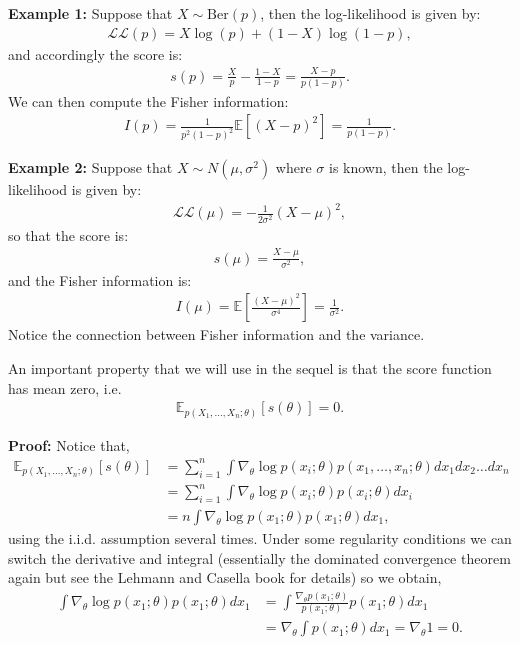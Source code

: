 \documentclass[twoside,12pt]{article}
\begin{document}
{\bf Example 1: } Suppose that $X \sim \text{Ber}(p)$, then the log-likelihood is given by:
\begin{align*}
\mathcal{LL}(p) = X \log (p) + (1-X)\log(1-p),
\end{align*}
and accordingly the score is:
\begin{align*}
s(p) = \frac{X}{p} - \frac{1 - X}{1-p} = \frac{X - p}{p(1-p)}.
\end{align*}
We can then compute the Fisher information:
\begin{align*}
I(p) = \frac{1}{p^2(1-p)^2}\mathbb{E}\left[ (X-p)^2 \right] = \frac{1}{p(1-p)}.
\end{align*}

{\bf Example 2: } Suppose that $X \sim N(\mu,\sigma^2)$ where $\sigma$ is known, then the log-likelihood is given by:
\begin{align*}
\mathcal{LL}(\mu) = - \frac{1}{2 \sigma^2}  (X - \mu)^2,
\end{align*}
so that the score is:
\begin{align*}
s(\mu) = \frac{X - \mu}{ \sigma^2},
\end{align*}
and the Fisher information is:
\begin{align*}
I(\mu) = \mathbb{E}\left[ \frac{(X - \mu)^2}{ \sigma^4} \right] = \frac{1}{\sigma^2}.
\end{align*}
Notice the connection between Fisher information and the variance. 

\vspace{1cm}


An important property that we will use in the sequel is that the score function has mean zero, i.e.
\begin{align*}
\mathbb{E}_{p(X_1,\ldots,X_n;\theta)} [s(\theta)] = 0.
\end{align*}

{\bf Proof: } Notice that,
\begin{align*}
\mathbb{E}_{p(X_1,\ldots,X_n;\theta)} [s(\theta)] &=    \sum_{i=1}^n \int \nabla_{\theta}  \log p(x_i; \theta) p(x_1,\ldots,x_n;\theta) dx_1 dx_2 \ldots dx_n \\
&= \sum_{i=1}^n \int \nabla_{\theta}  \log p(x_i; \theta) p(x_i;\theta) dx_i \\
&= n \int \nabla_{\theta}  \log p(x_1; \theta) p(x_1;\theta) dx_1,
\end{align*}
using the i.i.d. assumption several times. Under some regularity conditions we can switch the derivative and integral (essentially the dominated convergence theorem again but see the Lehmann and Casella book for details) so we obtain,
\begin{align*}
\int \nabla_{\theta}  \log p(x_1; \theta) p(x_1;\theta) dx_1 &= 
\int \frac{\nabla_{\theta} p(x_1; \theta)}{ p(x_1; \theta) } p(x_1;\theta) dx_1 \\
&=\nabla_{\theta} \int p(x_1; \theta) dx_1 = \nabla_{\theta} 1 = 0.
\end{align*}
\end{document}
